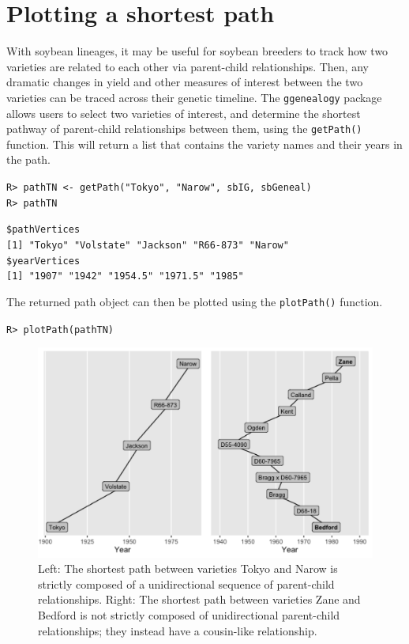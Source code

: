 \documentclass[11pt,a4paper,oldfontcommands,openany]{memoir}
\DeclareRobustCommand{\mybox}[2][gray!15]{%
\begin{tcolorbox}[   %
        breakable,
        left=0pt,
        right=0pt,
        top=0pt,
        bottom=0pt,
        colback=#1,
        colframe=#1,
        width=\dimexpr\textwidth\relax, 
        enlarge left by=0mm,
        boxsep=5pt,
        arc=0pt,outer arc=0pt,
        ]
        #2
\end{tcolorbox}
}
\numberwithin{equation}{section} %
\newcommand{\code}[1]{{\texttt{#1}}}
\newcommand{\pkg}[1]{{\texttt{#1}}}
\begin{document}
\section{Plotting a shortest path}

With soybean lineages, it may be useful for soybean breeders to track how two varieties are related to each other via parent-child relationships. Then, any dramatic changes in yield and other measures of interest between the two varieties can be traced across their genetic timeline. The \pkg{ggenealogy} package allows users to select two varieties of interest, and determine the shortest pathway of parent-child relationships between them, using the \code{getPath()} function. This will return a list that contains the variety names and their years in the path.

\mybox{
\texttt{R> pathTN <- getPath("Tokyo", "Narow", sbIG, sbGeneal)}\\
\texttt{R> pathTN}
}

\mybox[green!10]{
\texttt{\$pathVertices}\\
\texttt{[1] "Tokyo"    "Volstate" "Jackson"  "R66-873"  "Narow"}\\   

\texttt{\$yearVertices}\\
\texttt{[1] "1907"   "1942"   "1954.5" "1971.5" "1985"}
}

The returned path object can then be plotted using the \code{plotPath()} function.

\mybox{
\texttt{R> plotPath(pathTN)}
}

\begin{figure}[h]
    \begin{framed}
    \centering
    \includegraphics[width=\textwidth]{pathTNZB}
    \end{framed}
    \caption{Left: The shortest path between varieties Tokyo and Narow is strictly composed of a unidirectional sequence of parent-child relationships. Right: The shortest path between varieties Zane and Bedford is not strictly composed of unidirectional parent-child relationships; they instead have a cousin-like relationship.}
    \label{fig:pathTNZB}
\end{figure}
\end{document}
